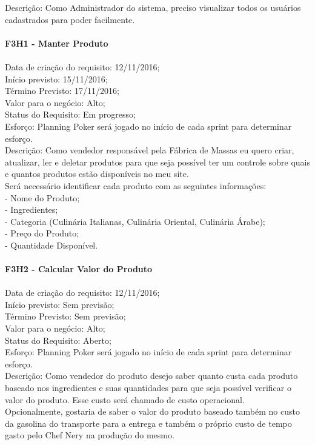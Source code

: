 \begin{apendicesenv}
\tab Descrição: Como Administrador do sistema, preciso visualizar todos os usuários cadastrados para poder facilmente.\\
\\
\textbf{F3H1 - Manter Produto}\\ \\
\tab Data de criação do requisito: 12/11/2016;\\
\tab Início previsto: 15/11/2016;\\
\tab Término Previsto: 17/11/2016;\\
\tab Valor para o negócio: Alto;\\
\tab Status do Requisito: Em progresso;\\
\tab Esforço: Planning Poker será jogado no início de cada sprint para determinar esforço.\\
\tab Descrição: Como vendedor responsável pela Fábrica de Massas eu quero criar, atualizar, ler e deletar produtos para que seja possível ter um controle sobre quais e quantos produtos estão disponíveis no meu site.\\
\tab Será necessário identificar cada produto com as seguintes informações:\\
\tab - Nome do Produto;\\
\tab - Ingredientes;\\
\tab - Categoria (Culinária Italianas, Culinária Oriental, Culinária Árabe);\\
\tab - Preço do Produto;\\
\tab - Quantidade Disponível.\\
\\
\textbf{F3H2 - Calcular Valor do Produto}\\ \\
\tab Data de criação do requisito: 12/11/2016;\\
\tab Início previsto: Sem previsão;\\
\tab Término Previsto: Sem previsão;\\
\tab Valor para o negócio: Alto;\\
\tab Status do Requisito: Aberto;\\
\tab Esforço: Planning Poker será jogado no início de cada sprint para determinar esforço.\\
\tab Descrição: Como vendedor do produto desejo saber quanto custa cada produto baseado nos ingredientes e suas quantidades para que seja possível verificar o valor do produto. Esse custo será chamado de custo operacional.\\
\tab Opcionalmente, gostaria de saber o valor do produto baseado também no custo da gasolina do transporte para a entrega e também o próprio custo de tempo gasto pelo Chef Nery na produção do mesmo.\\

\end{apendicesenv}
